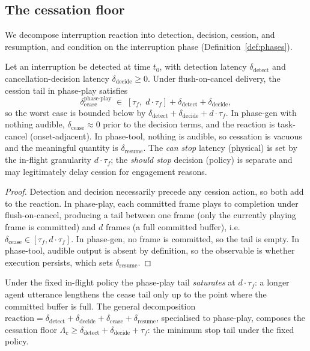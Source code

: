 \subsection{The cessation floor}
We decompose interruption reaction into detection, decision, cession, and resumption, and
condition on the interruption phase (Definition~\ref{def:phases}).

\begin{theorem}
\label{thm:cessation_floor}
Let an interruption be detected at time $t_0$, with detection latency
$\delta_{\mathrm{detect}}$ and cancellation-decision latency $\delta_{\mathrm{decide}} \geq
0$.
Under flush-on-cancel delivery, the cession tail in phase-play satisfies
\begin{equation}
  \delta_{\mathrm{cease}}^{\mathrm{phase\text{-}play}} \;\in\;
  [\tau_f,\; d \cdot \tau_f] + \delta_{\mathrm{detect}} + \delta_{\mathrm{decide}},
\end{equation}
so the worst case is bounded below by $\delta_{\mathrm{detect}} +
\delta_{\mathrm{decide}} + d \cdot \tau_f$.
In phase-gen with nothing audible, $\delta_{\mathrm{cease}} \approx 0$ prior to the decision
terms, and the reaction is task-cancel (onset-adjacent).
In phase-tool, nothing is audible, so cessation is vacuous and the meaningful quantity is
$\delta_{\mathrm{resume}}$.
The \emph{can stop} latency (physical) is set by the in-flight granularity $d \cdot \tau_f$;
the \emph{should stop} decision (policy) is separate and may legitimately delay cession for
engagement reasons.
\end{theorem}

\begin{proof}
Detection and decision necessarily precede any cession action, so both add to the reaction.
In phase-play, each committed frame plays to completion under flush-on-cancel, producing a
tail between one frame (only the currently playing frame is committed) and $d$ frames (a full
committed buffer), i.e.\ $\delta_{\mathrm{cease}} \in [\tau_f, d \cdot \tau_f]$.
In phase-gen, no frame is committed, so the tail is empty.
In phase-tool, audible output is absent by definition, so the observable is whether execution
persists, which sets $\delta_{\mathrm{resume}}$.
\end{proof}

\begin{remark}
\label{rem:saturation}
Under the fixed in-flight policy the phase-play tail \emph{saturates} at $d \cdot \tau_f$: a
longer agent utterance lengthens the cease tail only up to the point where the committed
buffer is full.
The general decomposition $\mathrm{reaction} = \delta_{\mathrm{detect}} +
\delta_{\mathrm{decide}} + \delta_{\mathrm{cease}} + \delta_{\mathrm{resume}}$, specialised
to phase-play, composes the cessation floor $\Lambda_c \geq \delta_{\mathrm{detect}} +
\delta_{\mathrm{decide}} + \tau_f$: the minimum stop tail under the fixed policy.
\end{remark}

